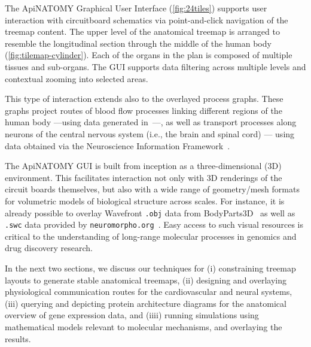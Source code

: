 The ApiNATOMY Graphical User Interface (\cref{fig:24tiles}) supports user interaction with circuitboard schematics via point-and-click navigation of the treemap content. The upper level of the anatomical treemap is arranged to resemble the longitudinal section through the middle of the human body (\cref{fig:tilemap-cylinder}). Each of the organs in the plan is composed of multiple tissues and sub-organs. The GUI supports data filtering across multiple levels and contextual zooming into selected areas.

This type of interaction extends also to the overlayed process graphs.
These graphs project routes of blood flow processes linking different regions of the human body ---using data generated in~\cite{deB11}---, as well as transport processes along neurons of the central nervous system (i.e., the brain and spinal cord) --- using data obtained via the Neuroscience Information Framework~\cite{Gar+08}.

The ApiNATOMY GUI is built from inception as a three-dimensional (3D) environment. This facilitates interaction not only with 3D renderings of the circuit boards themselves, but also with a wide range of geometry/mesh formats for volumetric models of biological structure across scales. For instance, it is already possible to overlay Wavefront \texttt{.obj} data from BodyParts3D~\cite{MFT+09} as well as \texttt{.swc} data provided by \texttt{neuromorpho.org}~\cite{Asc06}. Easy access to such visual resources is critical to the understanding of long-range molecular processes in genomics and drug discovery research.

In the next two sections, we discuss our techniques for (i) constraining treemap layouts to generate stable anatomical treemaps,
(ii) designing and overlaying physiological communication routes for the cardiovascular and neural systems,
(iii) querying and depicting protein architecture diagrams for the anatomical overview of gene expression data, and
(iiii) running simulations using mathematical models relevant to molecular mechanisms, and overlaying the results.


